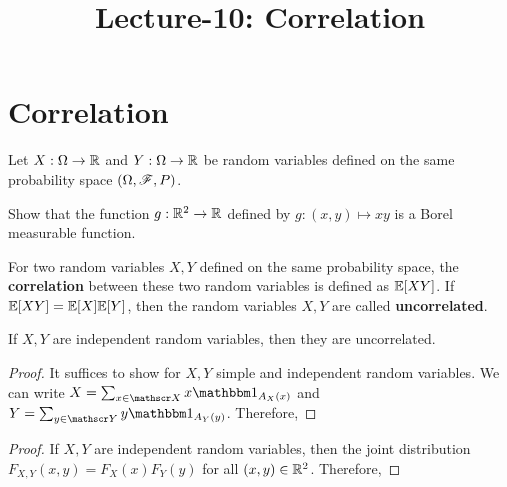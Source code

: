 \documentclass[letterpaper,10pt,english]{article}
\title{Lecture-10: Correlation}
\author{}
\begin{document}
\maketitle

\section{Correlation}
Let $X:\Omega\to\mathbb{R}$ and $Y:\Omega\to\mathbb{R}$ be random variables defined on the same probability space $(\Omega,\mathscr{F},P)$. 
\begin{tcolorbox}
\begin{exerc} 
Show that the function $g: \mathbb{R}^2 \to \mathbb{R}$ defined by $g: (x,y) \mapsto xy$ is a Borel measurable function. 
\end{exerc}
\end{tcolorbox}
\begin{defn}[Correlation] 
For two random variables $X,Y$ defined on the same probability space, 
the \textbf{correlation} between these two random variables is defined as $\mathbb{E}[XY]$. 
If $\mathbb{E}[XY] = \mathbb{E}[X]\mathbb{E}[Y]$, then the random variables $X,Y$ are called \textbf{uncorrelated}. 
\end{defn}
\begin{lem}
If $X, Y$ are independent random variables, then they are uncorrelated. 
\end{lem}
\begin{proof}
It suffices to show for $X,Y$ simple and independent random variables.
We can write $X = \sum_{x\in \sX}x\Ind{A_X(x)}$ and  $Y = \sum_{y\in \sY}y\Ind{A_Y(y)}$. 
Therefore, 
\end{proof}
\begin{proof}
If $X, Y$ are independent random variables, 
then the joint distribution $F_{X,Y}(x,y) = F_X(x)F_Y(y)$ for all $(x,y) \in \mathbb{R}^2$.
Therefore, 
\end{proof}
\end{document}
